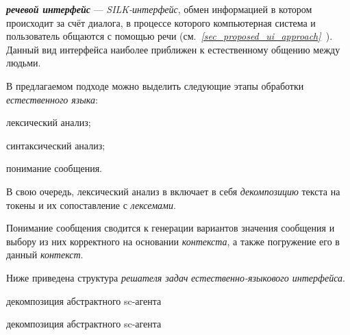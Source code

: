 \begin{SCn}


\end{SCn}

\textbf{\textit{речевой интерфейс}} --- \textit{SILK-интерфейс}, обмен информацией в котором происходит за счёт диалога, в процессе которого компьютерная система и пользователь общаются с помощью речи (см.~\textit{\ref{sec_proposed_ui_approach}~}).
Данный вид интерфейса наиболее приближен к естественному общению между людьми.

В предлагаемом подходе можно выделить следующие этапы обработки \textit{естественного языка}:
\begin{textitemize}
    \item лексический анализ;
    \item синтаксический анализ;
    \item понимание сообщения.
\end{textitemize}

В свою очередь, лексический анализ в включает в себя \textit{декомпозицию} текста на токены и их сопоставление с \textit{лексемами}.

Понимание сообщения сводится к генерации вариантов значения сообщения и выбору из них корректного на основании \textit{контекста}, а также погружение его в данный \textit{контекст}.

Ниже приведена структура \textit{решателя задач} \textit{естественно-языкового интерфейса}.

\begin{SCn}

    \begin{scnrelfromset}{декомпозиция абстрактного sc-агента}
        \begin{scnindent}
            \begin{scnrelfromset}{декомпозиция абстрактного sc-агента}
            \end{scnrelfromset}
        \end{scnindent}
    \end{scnrelfromset}

\end{SCn}

